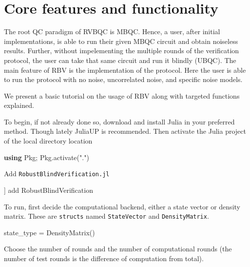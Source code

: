 \documentclass[
]{article}
\newenvironment{Shaded}{}{}
\newcommand{\BuiltInTok}[1]{\textcolor[rgb]{0.00,0.50,0.00}{#1}}
\newcommand{\FunctionTok}[1]{\textcolor[rgb]{0.02,0.16,0.49}{#1}}
\newcommand{\ImportTok}[1]{\textcolor[rgb]{0.00,0.50,0.00}{\textbf{#1}}}
\newcommand{\NormalTok}[1]{#1}
\newcommand{\OperatorTok}[1]{\textcolor[rgb]{0.40,0.40,0.40}{#1}}
\begin{document}
\section{Core features and
functionality}\label{core-features-and-functionality}

The root QC paradigm of RVBQC is MBQC. Hence, a user, after initial
implementations, is able to run their given MBQC circuit and obtain
noiseless results. Further, without impelementing the multiple rounds of
the verification protocol, the user can take that same circuit and run
it blindly (UBQC). The main feature of RBV is the implementation of the
protocol. Here the user is able to run the protocol with no noise,
uncorrelated noise, and specific noise models.

We present a basic tutorial on the usage of RBV along with targeted
functions explained.

To begin, if not already done so, download and install Julia in your
preferred method. Though lately JuliaUP is recommended. Then activate
the Julia project of the local directory location

\begin{Shaded}
\begin{Highlighting}[]
\ImportTok{using} \BuiltInTok{Pkg;}\NormalTok{ Pkg.activate(".")}
\end{Highlighting}
\end{Shaded}

Add \texttt{RobustBlindVerification.jl}

\begin{Shaded}
\begin{Highlighting}[]
\NormalTok{] add RobustBlindVerification}
\end{Highlighting}
\end{Shaded}

To run, first decide the computational backend, either a state vector or
density matrix. These are \texttt{structs} named \texttt{StateVector}
and \texttt{DensityMatrix}.

\begin{Shaded}
\begin{Highlighting}[]
\NormalTok{state\_type }\OperatorTok{=} \FunctionTok{DensityMatrix}\NormalTok{()}
\end{Highlighting}
\end{Shaded}

Choose the number of rounds and the number of computational rounds (the
number of test rounds is the difference of computation from total).
\end{document}
